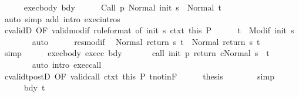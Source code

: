 \begin{isabellebody}
\ \ \ \ \isamarkupfalse%
\ exec{\isacharunderscore}body\ bdy\isanewline
\ \ \ \ \isamarkupfalse%
\ {\isachardoublequoteopen}{\isasymGamma}{\isasymturnstile}{\isasymlangle}{\isacharparenleft}Call\ p\ {\isacharparenright}{\isacharcomma}Normal\ {\isacharparenleft}init\ s{\isacharparenright}{\isasymrangle}\ {\isasymRightarrow}\ Normal\ t{\isacharprime}{\isachardoublequoteclose}\isanewline
\ \ \ \ \ \ \isamarkupfalse%
\ {\isacharparenleft}auto\ simp\ add{\isacharcolon}\ intro{\isacharcolon}\ exec{\isachardot}intros{\isacharparenright}\isanewline
\ \ \ \ \isamarkupfalse%
\ cvalidD\ {\isacharbrackleft}OF\ valid{\isacharunderscore}modif\ {\isacharbrackleft}rule{\isacharunderscore}format{\isacharcomma}\ of\ {\isachardoublequoteopen}init\ s{\isachardoublequoteclose}{\isacharbrackright}\ ctxt{\isacharprime}\ this{\isacharbrackright}\ P\isanewline
\ \ \ \ \isamarkupfalse%
\ {\isachardoublequoteopen}t{\isacharprime}\ {\isasymin}\ Modif\ {\isacharparenleft}init\ s{\isacharparenright}{\isachardoublequoteclose}\isanewline
\ \ \ \ \ \ \isamarkupfalse%
\ auto\isanewline
\ \ \ \ \isamarkupfalse%
\ res{\isacharunderscore}modif\ \isamarkupfalse%
\ {\isachardoublequoteopen}Normal\ {\isacharparenleft}return{\isacharprime}\ s\ t{\isacharprime}{\isacharparenright}\ {\isacharequal}\ Normal\ {\isacharparenleft}return\ s\ t{\isacharprime}{\isacharparenright}{\isachardoublequoteclose}\isanewline
\ \ \ \ \ \ \isamarkupfalse%
\ simp\isanewline
\ \ \ \ \isamarkupfalse%
\ exec{\isacharunderscore}body\ exec{\isacharunderscore}c\ bdy\ \isanewline
\ \ \ \ \isamarkupfalse%
\ {\isachardoublequoteopen}{\isasymGamma}{\isasymturnstile}{\isasymlangle}call\ init\ p\ return{\isacharprime}\ c{\isacharcomma}Normal\ s{\isasymrangle}\ {\isasymRightarrow}\ t{\isachardoublequoteclose}\ \isanewline
\ \ \ \ \ \ \isamarkupfalse%
\ {\isacharparenleft}auto\ intro{\isacharcolon}\ exec{\isacharunderscore}call{\isacharparenright}\isanewline
\ \ \ \ \isamarkupfalse%
\ cvalidt{\isacharunderscore}postD\ {\isacharbrackleft}OF\ valid{\isacharunderscore}call\ ctxt\ this{\isacharbrackright}\ P\ t{\isacharunderscore}notin{\isacharunderscore}F\isanewline
\ \ \ \ \isamarkupfalse%
\ {\isacharquery}thesis\isanewline
\ \ \ \ \ \ \isamarkupfalse%
\ simp\isanewline
\ \ \isamarkupfalse%
\isanewline
\ \ \ \ \isamarkupfalse%
\ bdy\ t{\isacharprime}\isanewline

\end{isabellebody}
